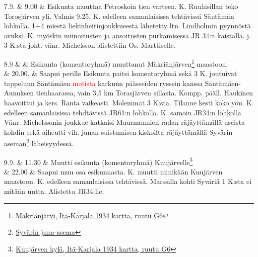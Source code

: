 \documentclass[11pt,a5paper,oneside]{book}
\begin{document}
\taulustop


7.9. & 9.00 & Esikunta muuttaa Petroskoin tien varteen.  K. Ruuhisillan teko Torosjärven yli. Valmis 9.25.  K. edelleen samanlaisissa tehtävissä Säntämän lohkolla. 1+4 miestä liekinheitinjoukkueesta lähetetty ltn. Lindholmin pyynnöstä avuksi.  K. myöskin miinoitusten ja ansoitusten purkamisessa JR 34:n kaistalla.\newline {} j. 3 K:sta joht. vänr. Michelsson alistettiin Os. Marttiselle. \\

\newpage

8.9 & & Esikunta (komentoryhmä) muuttanut Mäkriänjärven\footnote{\href{https://www.google.fi/maps/place/Ozero+Megrozero/@61.0482539,33.4942843,9161m/}{Mäkriänjärvi, Itä-Karjala 1934 kartta, ruutu G6}} maastoon.\\

& 20.00. & Saapui perille \newline Esikunta paitsi komentoryhmä sekä 3 K. joutuivat tappeluun Säntämäen \textcolor{red}{motista} karkuun päässeiden ryssein kanssa Säntämäen-Aunuksen tienhaarassa, vain 3,5 km Torasjärven sillasta. Kompp. pääll. Haukinen haavoittui ja kers. Ranta vaikeasti. Molemmat 3 K:sta. Tilanne kesti koko yön.  K. edelleen samanlaisissa tehdtävissä JR61:n lohkolla.  K. samoin JR34:n lohkolla Vänr. Michelssonin joukkue katkaisi Muurmannien radan räjäyttämällä useista kohdin sekä aiheutti vih. junan suistumisen kiskoilta räjäyttämällä Syvärin aseman\footnote{\href{https://www.google.fi/maps/place/Svirj/@60.9491397,34.0823469,17z/}{Syvärin juna-asema}} läheisyydessä. \\

\taulustop


9.9. & 11.30 & Muutti esikunta (komentoryhmä) Kuujärvelle\footnote{\href{https://www.google.fi/maps/place/Klub+Sela+Mikhaylovskoye/@61.0159198,33.731745,17z/}{Kuujärven kylä, Itä-Karjala 1934 kartta, ruutu G6}} \\

& 22.00 & Saapui muu osa esikunnasta. K. muutti niinikään Kuujärven maastoon. K. edelleen samanlaisissa tehtävissä. Marssilla kohti Syväriä 1 K:sta ei mitään uutta. Alistettu JR34:lle. \\
\end{document}
